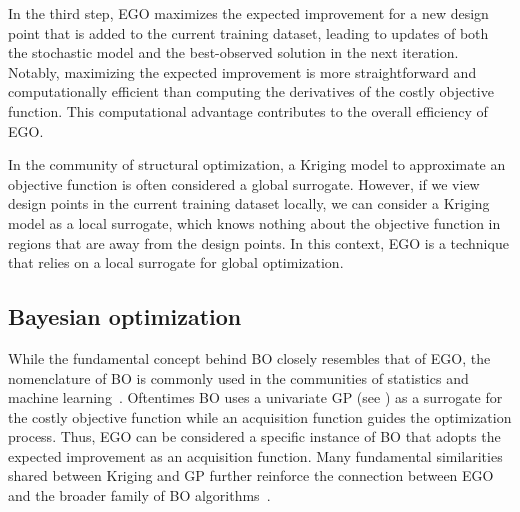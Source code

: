 \documentclass[iicol,sn-basic]{sn-jnl}%
\begin{document}
In the third step, EGO maximizes the expected improvement for a new design point that is added to the current training dataset, leading to updates of both the stochastic model and the best-observed solution in the next iteration.
Notably, maximizing the expected improvement is more straightforward and computationally efficient than computing the derivatives of the costly objective function.
This computational advantage contributes to the overall efficiency of EGO.

In the community of structural optimization, a Kriging model to approximate an objective function is often considered a global surrogate.
However, if we view design points in the current training dataset locally, we can consider a Kriging model as a local surrogate, which knows nothing about the objective function in regions that are away from the design points.
In this context, EGO is a technique that relies on a local surrogate for global optimization.  

\subsection{Bayesian optimization}\label{Sec32}

While the fundamental concept behind BO closely resembles that of EGO, the nomenclature of BO is commonly used in the communities of statistics and machine learning~\citep{Bull2011,Snoek2012,Shahriari2016,Frazier2018}.
Oftentimes BO uses a univariate GP (see ) as a surrogate for the costly objective function while an acquisition function guides the optimization process. 
Thus, EGO can be considered a specific instance of BO that adopts the expected improvement as an acquisition function.
Many fundamental similarities shared between Kriging and GP further reinforce the connection between EGO and the broader family of BO algorithms~\citep{Christianson2023}.
\end{document}
